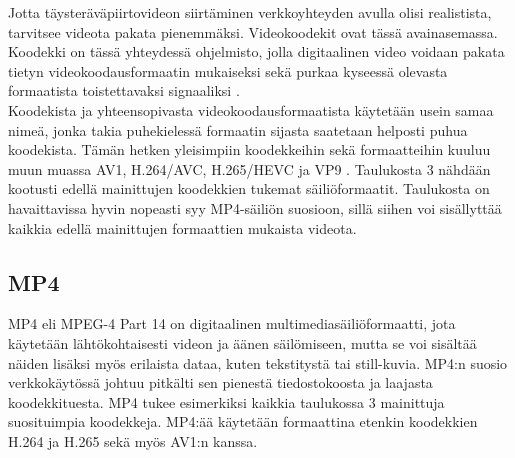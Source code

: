 \documentclass[finnish, 12pt, a4paper, elec, utf8, a-1b, online]{aaltothesis}
\begin{document}
\noindent Jotta täysteräväpiirtovideon siirtäminen verkkoyhteyden avulla olisi realistista, tarvitsee videota pakata pienemmäksi. Videokoodekit ovat tässä avainasemassa. Koodekki on tässä yhteydessä ohjelmisto, jolla digitaalinen video voidaan pakata tietyn videokoodausformaatin mukaiseksi sekä purkaa kyseessä olevasta formaatista toistettavaksi signaaliksi \cite{Codec}. \\

\noindent Koodekista ja yhteensopivasta videokoodausformaatista käytetään usein samaa nimeä, jonka takia puhekielessä formaatin sijasta saatetaan helposti puhua koodekista. Tämän hetken yleisimpiin koodekkeihin sekä formaatteihin kuuluu muun muassa AV1, H.264/AVC, H.265/HEVC ja VP9 \cite{Codec guide}. Taulukosta 3 nähdään kootusti edellä mainittujen koodekkien tukemat säiliöformaatit. Taulukosta on havaittavissa hyvin nopeasti syy MP4-säiliön suosioon, sillä siihen voi sisällyttää kaikkia edellä mainittujen formaattien mukaista videota.

\begin{table}[htb]
  \caption{Suosittuja videokoodekkeja ja niiden säiliöitä. \cite{Codec guide} \label{taulukko3}}
  \centering
\end{table}

\subsection*{MP4}

MP4 eli MPEG-4 Part 14 on digitaalinen multimediasäiliöformaatti, jota käytetään lähtökohtaisesti videon ja äänen säilömiseen, mutta se voi sisältää näiden lisäksi myös erilaista dataa, kuten tekstitystä tai still-kuvia. MP4:n suosio verkkokäytössä johtuu pitkälti sen pienestä tiedostokoosta ja laajasta koodekkituesta. MP4 tukee esimerkiksi kaikkia taulukossa 3 mainittuja suosituimpia koodekkeja. MP4:ää käytetään formaattina etenkin koodekkien H.264 ja H.265 sekä myös AV1:n kanssa. \\
\end{document}
